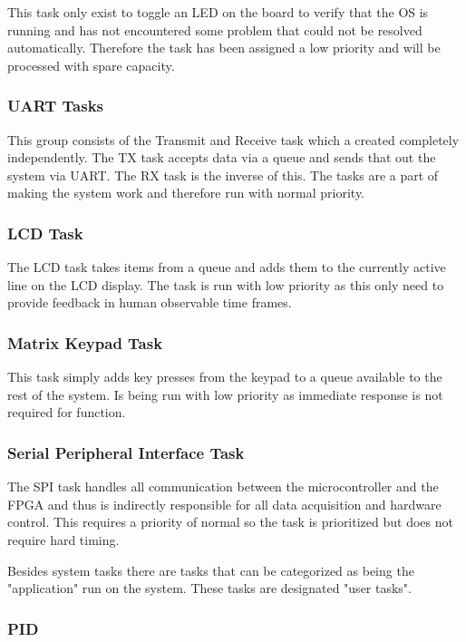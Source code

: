 \documentclass[../../../main]{subfiles}
\begin{document}
This task only exist to toggle an LED on the board to verify that the OS is running and has not encountered some problem that could not be resolved automatically. Therefore the task has been assigned a low priority and will be processed with spare capacity.

\subsubsection{UART Tasks}%

This group consists of the Transmit and Receive task which a created completely independently. The TX task accepts data via a queue and sends that out the system via UART. The RX task is the inverse of this. The tasks are a part of making the system work and therefore run with normal priority. 


\subsubsection{LCD Task}

The LCD task takes items from a queue and adds them to the currently active line on the LCD display. The task is run with low priority as this only need to provide feedback in human observable time frames.

\subsubsection{Matrix Keypad Task}

This task simply adds key presses from the keypad to a queue available to the rest of the system. Is being run with low priority as immediate response is not required for function.

\subsubsection{Serial Peripheral Interface Task}

The SPI task handles all communication between the microcontroller and the FPGA and thus is indirectly responsible for all data acquisition and hardware control. This requires a priority of normal so the task is prioritized but does not require hard timing.  

Besides system tasks there are tasks that can be categorized as being the "application" run on the system. These tasks are designated "user tasks".

\subsubsection{PID}
\end{document}
